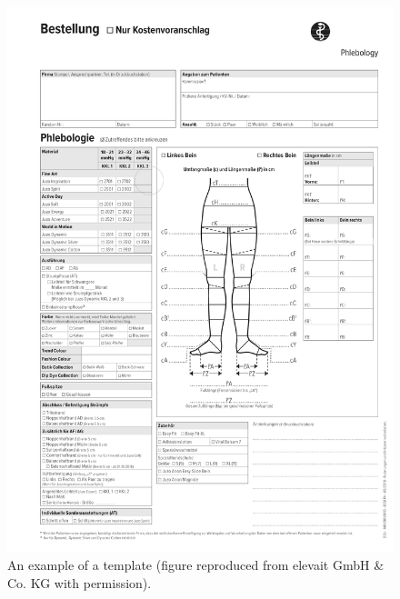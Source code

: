 \begin{figure}[H]
        \begin{center}
	    \includegraphics[scale=0.20]{images/Introduction/template.png}
	    \caption[Example of a template.]{An example of a template (figure reproduced from elevait GmbH \& Co. KG with permission).}
    	    \label{fig:exampleTemplate}
	    \end{center}
\end{figure}


